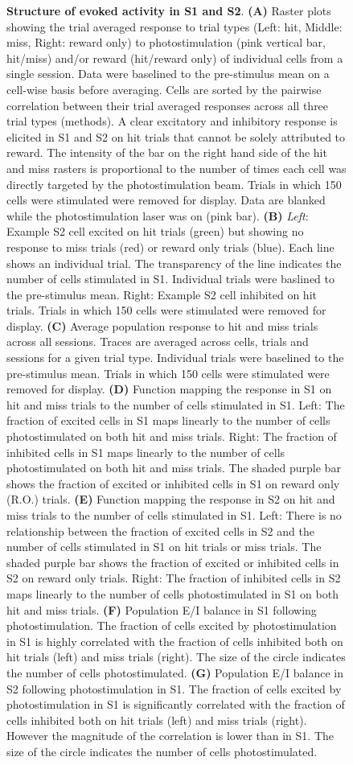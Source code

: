 \begin{figure}[htbp]
{\textbf{Structure of evoked activity in S1 and S2}. \textbf{(A)} Raster plots showing the trial averaged response to trial types (Left: hit, Middle: miss, Right: reward only) to photostimulation (pink vertical bar, hit/miss)  and/or reward (hit/reward only) of individual cells from a single session. Data were baselined to the pre-stimulus mean on a cell-wise basis before averaging. Cells are sorted by the pairwise correlation between their trial averaged responses across all three trial types (methods). A clear excitatory and inhibitory response is elicited in S1 and S2 on hit trials that cannot be solely attributed to reward. The intensity of the bar on the right hand side of the hit and miss rasters is proportional to the number of times each cell was directly targeted by the photostimulation beam. Trials in which 150 cells were stimulated were removed for display. Data are blanked while the photostimulation laser was on (pink bar). \textbf{(B)} \textit{Left}: Example S2 cell excited on hit trials (green) but showing no response to miss trials (red) or reward only trials (blue). Each line shows an individual trial. The transparency of the line indicates the number of cells stimulated in S1. Individual trials were baslined to the pre-stimulus mean. Right: Example S2 cell inhibited on hit trials. Trials in which 150 cells were stimulated were removed for display. \textbf{(C)} Average population response to hit and miss trials across all sessions. Traces are averaged across cells, trials and sessions for a given trial type. Individual trials were baselined to the pre-stimulus mean. Trials in which 150 cells were stimulated were removed for display. \textbf{(D)} Function mapping the response in S1 on hit and miss trials to the number of cells stimulated in S1. Left: The fraction of excited cells in S1 maps linearly to the number of cells photostimulated on both hit and miss trials. Right: The fraction of inhibited cells in S1 maps linearly to the number of cells photostimulated on both hit and miss trials. The shaded purple bar shows the fraction of excited or inhibited cells in S1 on reward only (R.O.) trials. \textbf{(E)} Function mapping the response in S2 on hit and miss trials to the number of cells stimulated in S1. Left: There is no relationship between the fraction of excited cells in S2 and the number of cells stimulated in S1 on hit trials or miss trials. The shaded purple bar shows the fraction of excited or inhibited cells in S2 on reward only trials. Right: The fraction of inhibited cells in S2 maps linearly to the number of cells photostimulated in S1 on both hit and miss trials. \textbf{(F)} Population E/I balance in S1 following photostimulation. The fraction of cells excited by photostimulation in S1 is highly correlated with the fraction of cells inhibited both on hit trials (left) and miss trials (right). The size of the circle indicates the number of cells photostimulated. \textbf{(G)} Population E/I balance in S2 following photostimulation in S1. The fraction of cells excited by photostimulation in S1 is significantly correlated with the fraction of cells inhibited both on hit trials (left) and miss trials (right). However the magnitude of the correlation is lower than in S1. The size of the circle indicates the number of cells photostimulated. 
}
\end{figure}
